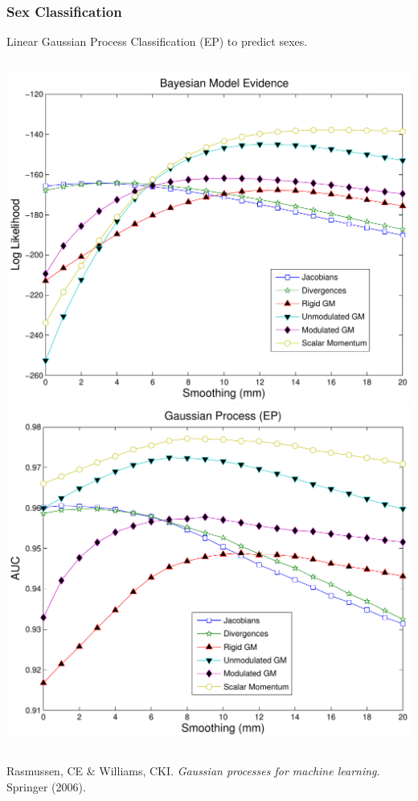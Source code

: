 \begin{frame}
\frametitle{Sex Classification}
Linear Gaussian Process Classification (EP) to predict sexes.
\begin{columns}[c]
\includegraphics[width=1\textwidth]{sex_loglikelihood}
\includegraphics[width=1\textwidth]{sex_auc_GP}
\end{columns}

\begin{tiny}
Rasmussen, CE \& Williams, CKI. \emph{Gaussian processes for machine learning}. Springer (2006).

\end{tiny}
\end{frame}

